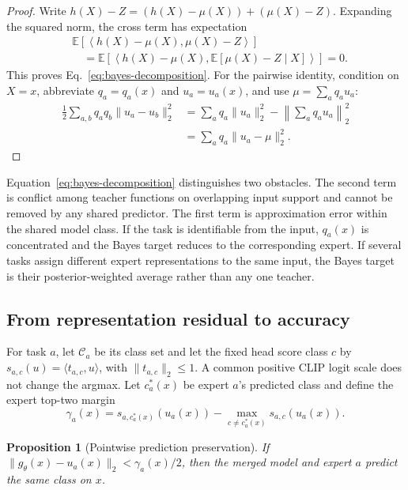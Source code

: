 \documentclass[letterpaper]{article} %
\theoremstyle{plain}
\newtheorem{proposition}[theorem]{Proposition}
\theoremstyle{definition}
\begin{document}
\begin{proof}
Write $h(X)-Z=(h(X)-\mu(X))+(\mu(X)-Z)$.
Expanding the squared norm, the cross term has expectation
\begin{align*}
&\mathbb E\!\left[
\left\langle h(X)-\mu(X),\mu(X)-Z\right\rangle
\right] \\
&\quad=
\mathbb E\!\left[
\left\langle h(X)-\mu(X),
\mathbb E[\mu(X)-Z\mid X]
\right\rangle
\right]=0.
\end{align*}
This proves Eq.~\eqref{eq:bayes-decomposition}.
For the pairwise identity, condition on $X=x$, abbreviate $q_a=q_a(x)$ and $u_a=u_a(x)$, and use $\mu=\sum_aq_au_a$:
\begin{align*}
\frac12\sum_{a,b}q_aq_b\|u_a-u_b\|_2^2
&=\sum_aq_a\|u_a\|_2^2-
\left\|\sum_aq_au_a\right\|_2^2 \\
&=\sum_aq_a\|u_a-\mu\|_2^2.
\end{align*}
\end{proof}

Equation~\eqref{eq:bayes-decomposition} distinguishes two obstacles.
The second term is conflict among teacher functions on overlapping input support and cannot be removed by any shared predictor.
The first term is approximation error within the shared model class.
If the task is identifiable from the input, $q_a(x)$ is concentrated and the Bayes target reduces to the corresponding expert.
If several tasks assign different expert representations to the same input, the Bayes target is their posterior-weighted average rather than any one teacher.

\subsection{From representation residual to accuracy}
\label{app:accuracy}

For task $a$, let $\mathcal C_a$ be its class set and let the fixed head score class $c$ by $s_{a,c}(u)=\langle t_{a,c},u\rangle$, with $\|t_{a,c}\|_2\le1$.
A common positive CLIP logit scale does not change the argmax.
Let $c_a^*(x)$ be expert $a$'s predicted class and define the expert top-two margin
\begin{equation}
\gamma_a(x)=s_{a,c_a^*(x)}(u_a(x))-
\max_{c\ne c_a^*(x)}s_{a,c}(u_a(x)).
\label{eq:expert-margin}
\end{equation}

\begin{proposition}[Pointwise prediction preservation]
\label{prop:pointwise-margin}
If $\|g_\theta(x)-u_a(x)\|_2<\gamma_a(x)/2$, then the merged model and expert $a$ predict the same class on $x$.
\end{proposition}
\end{document}
